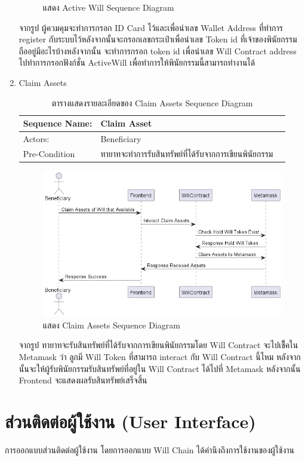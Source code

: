 \documentclass[12pt,oneside,openright,a4paper]{cpe-thai-project}
\begin{document}
\begin{enumerate}[label=\thesubsection.\arabic*,leftmargin=0pt,itemindent=1.25cm]
\begin{figure}[!thb]
			\caption{แสดง Active Will Sequence Diagram}
		\end{figure}
		\FloatBarrier
	\tab จากรูป ผู้ควมคุมจะทำการกรอก ID Card ไว้และเพื่อนำเลข Wallet Address ที่ทำการ register กับระบบไว้หลังจากนั้นจะกรอกเลขกระเป๋าเพื่อนำเลข Token id ที่เจ้าของพินัยกรรมถืออยู่มีอะไรบ้างหลังจากนั้น จะทำการกรอก token id เพื่อนำเลข Will Contract address ไปทำการกรอกฟังก์ชั่น ActiveWill เพื่อทำการให้พินัยกรรมนี้สามารถทำงานได้
	\item Claim Assets
	\begin{table}[h]
\centering
\caption{ตารางแสดงรายละเอียดของ Claim Assets Sequence Diagram}
\begin{tabularx}{\textwidth}{|l|X|X|} 
\hline
Sequence Name: & Claim Asset                                             \\ 
\hline
Actors:        & Beneficiary                                            \\ 
\hline
Pre-Condition  & ทายาทจะทำการรับสินทรัพย์ที่ได้รับจากการเขียนพินัยกรรม  \\
\hline
\end{tabularx}
\end{table}
		\begin{figure}[!thb]
			\centering
			\includegraphics[scale=0.45]{claimAssetseq}
			\caption{แสดง Claim Assets Sequence Diagram}
		\end{figure}
		\FloatBarrier
	\tab จากรูป ทายาทจะรับสินทรัพย์ที่ได้รับจากการเขียนพินัยกรรมโดย Will Contract จะไปเช็ึคใน Metamask ว่า ลูกมี Will Token ที่สามารถ interact กับ Will Contract นี้ไหม หลังจากนั้นจะให้ผู้รับพินัยกรรมรับสินทรัพย์ที่อยู่ใน Will Contract ได้ไปที่ Metamask หลังจากนั้น Frontend จะแสดงผลรับสินทรัพย์เสร็จสิ้น
	\end{enumerate}
\clearpage
\section{ส่วนติดต่อผู้ใช้งาน (User Interface)}
\tab การออกแบบส่วนติดต่อผู้ใช้งาน โดยการออกแบบ Will Chain ได้คำนึงถึงการใช้งานของผู้ใช้งาน 
\end{document}
